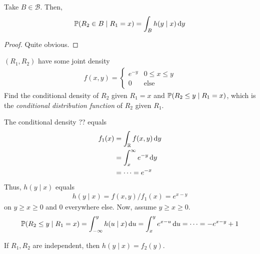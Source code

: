 \begin{lemma}
    Take $B \in \mathcal{B}$. Then,
    \begin{align}
        \mathbb{P}(R_2 \in B \mid R_1 = x) = \int_B h(y \mid x) \dd{y}
    \end{align}
\end{lemma}
\begin{proof}
    Quite obvious.
\end{proof}

\begin{example}
    $(R_1,R_2)$ have some joint density
    \begin{align}
        f(x,y) = \begin{cases}
            e^{-y} & 0 \le x \le y\\
            0 & \text{else}
        \end{cases}
    \end{align}
    Find the conditional density of $R_2$ given $R_1 = x$ and $\mathbb{P}(R_2 \le y \mid R_1 = x)$, which is the \textit{conditional distribution function} of $R_2$ given $R_1$.
\end{example}
\begin{solution}
    The conditional density ?? equals
    \begin{align}
        f_1(x) &= \int_{\mathbb{R}} f(x,y) \dd{y}\\
        &= \int_x^\infty e^{-y} \dd{y}\\
        &= \cdots = e^{-x}
    \end{align}
    Thus, $h(y \mid x)$ equals
    \begin{align}
        h(y \mid x) = f(x,y) / f_1(x) = e^{x - y}
    \end{align}
    on $y \ge x \ge 0$ and $0$ everywhere else. Now, assume $y \ge x \ge 0$.
    \begin{align}
        \mathbb{P}(R_2 \le y \mid R_1 = x) = \int_{-\infty}^y h(u \mid x) \dd{u} = \int_x^y e^{x-u} \dd{u} = \cdots = -e^{x-y} + 1
    \end{align}
\end{solution}

\begin{aside}
    If $R_1,R_2$ are independent, then $h(y \mid x) = f_2(y)$.
\end{aside}

